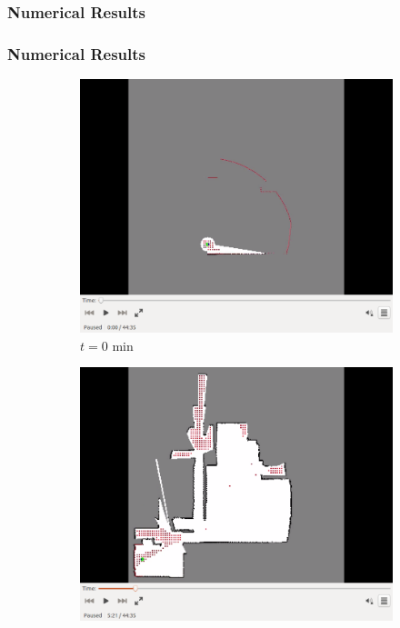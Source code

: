 \documentclass[11pt,professionalfonts,hyperref={pdftex,pdfpagemode=none,pdfstartview=FitH}]{beamer}
\begin{document}
\begin{frame}
\frametitle{Numerical Results}
\end{frame}

\begin{frame}
\frametitle{Numerical Results}

\begin{figure}[!ht]
    \centering
    \begin{subfigure}[t]{0.2\columnwidth}
        \centering
        \includegraphics[trim = {4.6cm 3.8cm 4.6cm 0}, clip, width=\textwidth]{0min.png}
        \caption*{$t=0$ min}
        \label{fig:IRL0min}
    \end{subfigure}
    \begin{subfigure}[t]{0.2\columnwidth}
        \centering
        \includegraphics[trim = {4.6cm 3.8cm 4.6cm 0}, clip, width=\textwidth]{5min.png}

\end{subfigure}
\end{figure}
\end{frame}
\end{document}
